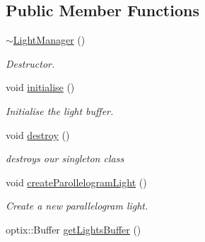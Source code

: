 \subsection*{Public Member Functions}
\begin{DoxyCompactItemize}
\item 
\hypertarget{class_light_manager_a07c7063f02e20a33c0984965991aa4af}{\hyperlink{class_light_manager_a07c7063f02e20a33c0984965991aa4af}{$\sim$\-Light\-Manager} ()}\label{class_light_manager_a07c7063f02e20a33c0984965991aa4af}

\begin{DoxyCompactList}\small\item\em Destructor. \end{DoxyCompactList}\item 
\hypertarget{class_light_manager_ae415dd0ef2294e649b546d928837b860}{void \hyperlink{class_light_manager_ae415dd0ef2294e649b546d928837b860}{initialise} ()}\label{class_light_manager_ae415dd0ef2294e649b546d928837b860}

\begin{DoxyCompactList}\small\item\em Initialise the light buffer. \end{DoxyCompactList}\item 
\hypertarget{class_light_manager_ae54246d612d778d892d6473a43a83d32}{void \hyperlink{class_light_manager_ae54246d612d778d892d6473a43a83d32}{destroy} ()}\label{class_light_manager_ae54246d612d778d892d6473a43a83d32}

\begin{DoxyCompactList}\small\item\em destroys our singleton class \end{DoxyCompactList}\item 
\hypertarget{class_light_manager_a714fcbcf37902d8bd0e0b5676d00e121}{void \hyperlink{class_light_manager_a714fcbcf37902d8bd0e0b5676d00e121}{create\-Parollelogram\-Light} ()}\label{class_light_manager_a714fcbcf37902d8bd0e0b5676d00e121}

\begin{DoxyCompactList}\small\item\em Create a new parallelogram light. \end{DoxyCompactList}\item 
\hypertarget{class_light_manager_ad265f49547aeb715f2b33642a7a22fe6}{optix\-::\-Buffer \hyperlink{class_light_manager_ad265f49547aeb715f2b33642a7a22fe6}{get\-Lights\-Buffer} ()}\label{class_light_manager_ad265f49547aeb715f2b33642a7a22fe6}


\end{DoxyCompactItemize}
